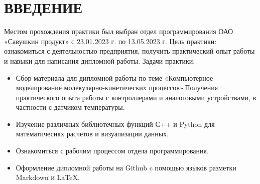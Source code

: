 \chapter*{ВВЕДЕНИЕ}
\label{ch:intro}
Местом прохождения практики был выбран отдел программирования ОАО «Савушкин продукт» с 23.01.2023 г. по 13.05.2023 г.
Цель практики: ознакомиться с деятельностью предприятия, получить практический опыт работы и навыки для написания дипломной работы.
Задачи практики:
\begin{itemize}
        \item Сбор материала для дипломной работы по теме «Компьютерное моделирование молекулярно-кинетических процессов».Получения практического опыта работы с контроллерами и аналоговыми устройствами, в частности с датчиком температуры.
        \item  Изучение различных библиотечных функций С++ и Python для математичесикх расчетов и визуализации данных.
        \item Ознакомиться с рабочим процессом отдела программирования.
        \item Оформление дипломной работы на Github c помощью языков разметки Markdown и \LaTeX .
    \end{itemize}

\endinput